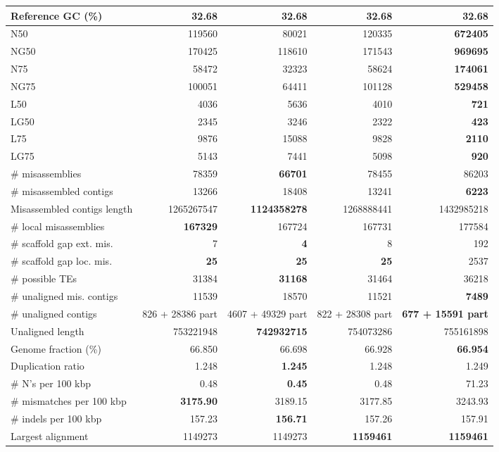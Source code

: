 \documentclass[12pt,a4paper]{article}
\begin{document}
\begin{table}[ht]
\begin{center}
\begin{tabular}{|l*{4}{|r}|}
Reference GC (\%) & 32.68 & 32.68 & 32.68 & 32.68 \\ \hline
N50 & 119560 & 80021 & 120335 & {\bf 672405} \\ \hline
NG50 & 170425 & 118610 & 171543 & {\bf 969695} \\ \hline
N75 & 58472 & 32323 & 58624 & {\bf 174061} \\ \hline
NG75 & 100051 & 64411 & 101128 & {\bf 529458} \\ \hline
L50 & 4036 & 5636 & 4010 & {\bf 721} \\ \hline
LG50 & 2345 & 3246 & 2322 & {\bf 423} \\ \hline
L75 & 9876 & 15088 & 9828 & {\bf 2110} \\ \hline
LG75 & 5143 & 7441 & 5098 & {\bf 920} \\ \hline
\# misassemblies & 78359 & {\bf 66701} & 78455 & 86203 \\ \hline
\# misassembled contigs & 13266 & 18408 & 13241 & {\bf 6223} \\ \hline
Misassembled contigs length & 1265267547 & {\bf 1124358278} & 1268888441 & 1432985218 \\ \hline
\# local misassemblies & {\bf 167329} & 167724 & 167731 & 177584 \\ \hline
\# scaffold gap ext. mis. & 7 & {\bf 4} & 8 & 192 \\ \hline
\# scaffold gap loc. mis. & {\bf 25} & {\bf 25} & {\bf 25} & 2537 \\ \hline
\# possible TEs & 31384 & {\bf 31168} & 31464 & 36218 \\ \hline
\# unaligned mis. contigs & 11539 & 18570 & 11521 & {\bf 7489} \\ \hline
\# unaligned contigs & 826 + 28386 part & 4607 + 49329 part & 822 + 28308 part & {\bf 677 + 15591 part} \\ \hline
Unaligned length & 753221948 & {\bf 742932715} & 754073286 & 755161898 \\ \hline
Genome fraction (\%) & 66.850 & 66.698 & 66.928 & {\bf 66.954} \\ \hline
Duplication ratio & 1.248 & {\bf 1.245} & 1.248 & 1.249 \\ \hline
\# N's per 100 kbp & 0.48 & {\bf 0.45} & 0.48 & 71.23 \\ \hline
\# mismatches per 100 kbp & {\bf 3175.90} & 3189.15 & 3177.85 & 3243.93 \\ \hline
\# indels per 100 kbp & 157.23 & {\bf 156.71} & 157.26 & 157.91 \\ \hline
Largest alignment & 1149273 & 1149273 & {\bf 1159461} & {\bf 1159461} \\ \hline

\end{tabular}
\end{center}
\end{table}
\end{document}
